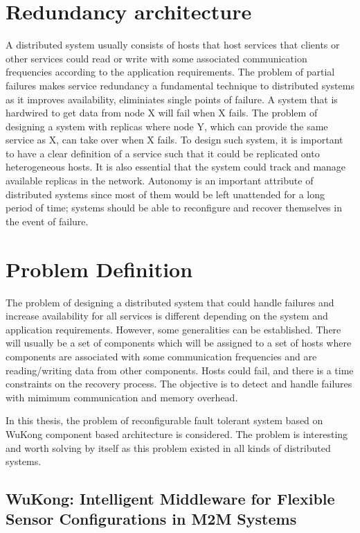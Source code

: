 \section{Redundancy architecture}

A distributed system usually consists of hosts that host services that clients or
other services could read or write with some associated communication
frequencies according to the application requirements. The
problem of partial failures makes service redundancy a fundamental technique to
distributed systems as it improves availability, eliminiates single points of
failure. A system that is hardwired to get data from node X will fail when
X fails. The problem of designing a system with replicas where node Y, which
can provide the same service as X, can take over when X fails. To design such
system, it is important to have a clear definition of a service such that it
could be replicated onto heterogeneous hosts. It is
also essential that the system could track and manage available replicas in the
network. Autonomy is an important attribute of distributed systems since most
of them would be left unattended for a long period of time; systems should be
able to reconfigure and recover themselves in the event of failure.

\section{Problem Definition}

The problem of designing a distributed system that could handle failures and
increase availability for all services is different depending on the system and
application requirements. However, some generalities can be established. There will
usually be a set of components which will be assigned to a set of hosts where 
components are associated with some communication frequencies and are
reading/writing data from other components. Hosts could fail, and there is
a time constraints on the recovery process. The objective is to detect and
handle failures with mimimum communication and memory overhead.

In this thesis, the problem of reconfigurable fault tolerant system based on
WuKong component based architecture is considered. The problem is
interesting and worth solving by itself as this problem existed in all
kinds of distributed systems.

\subsection{WuKong: Intelligent Middleware for Flexible Sensor Configurations in
  M2M Systems}

